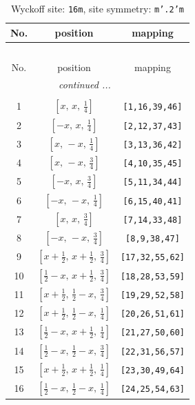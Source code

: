 \documentclass[fleqn,8pt]{jsarticle}
\begin{document}
\renewcommand{\arraystretch}{1.2}
\begin{longtable}{ccc}
\caption{Wyckoff site: {\tt 16m}, site symmetry: {\tt m'.2'm}}
 \\
 \hline \hline
No. & position & mapping \\ \hline \endfirsthead

\multicolumn{2}{l}{\tablename\ \thetable{}} \\
 \hline \hline
No. & position & mapping \\ \hline \endhead

 \hline \hline
\multicolumn{2}{r}{\footnotesize\it continued ...} \\ \endfoot

 \hline \hline
\multicolumn{2}{r}{} \\ \endlastfoot

1 & $\left[ x,\, x,\, \frac{1}{4} \right]$ & {\tt [1,16,39,46]} \\ \hline
2 & $\left[ - x,\, x,\, \frac{1}{4} \right]$ & {\tt [2,12,37,43]} \\ \hline
3 & $\left[ x,\, - x,\, \frac{1}{4} \right]$ & {\tt [3,13,36,42]} \\ \hline
4 & $\left[ x,\, - x,\, \frac{3}{4} \right]$ & {\tt [4,10,35,45]} \\ \hline
5 & $\left[ - x,\, x,\, \frac{3}{4} \right]$ & {\tt [5,11,34,44]} \\ \hline
6 & $\left[ - x,\, - x,\, \frac{1}{4} \right]$ & {\tt [6,15,40,41]} \\ \hline
7 & $\left[ x,\, x,\, \frac{3}{4} \right]$ & {\tt [7,14,33,48]} \\ \hline
8 & $\left[ - x,\, - x,\, \frac{3}{4} \right]$ & {\tt [8,9,38,47]} \\ \hline
9 & $\left[ x + \frac{1}{2},\, x + \frac{1}{2},\, \frac{3}{4} \right]$ & {\tt [17,32,55,62]} \\ \hline
10 & $\left[ \frac{1}{2} - x,\, x + \frac{1}{2},\, \frac{3}{4} \right]$ & {\tt [18,28,53,59]} \\ \hline
11 & $\left[ x + \frac{1}{2},\, \frac{1}{2} - x,\, \frac{3}{4} \right]$ & {\tt [19,29,52,58]} \\ \hline
12 & $\left[ x + \frac{1}{2},\, \frac{1}{2} - x,\, \frac{1}{4} \right]$ & {\tt [20,26,51,61]} \\ \hline
13 & $\left[ \frac{1}{2} - x,\, x + \frac{1}{2},\, \frac{1}{4} \right]$ & {\tt [21,27,50,60]} \\ \hline
14 & $\left[ \frac{1}{2} - x,\, \frac{1}{2} - x,\, \frac{3}{4} \right]$ & {\tt [22,31,56,57]} \\ \hline
15 & $\left[ x + \frac{1}{2},\, x + \frac{1}{2},\, \frac{1}{4} \right]$ & {\tt [23,30,49,64]} \\ \hline
16 & $\left[ \frac{1}{2} - x,\, \frac{1}{2} - x,\, \frac{1}{4} \right]$ & {\tt [24,25,54,63]} \\
\end{longtable}
\end{document}
